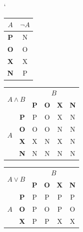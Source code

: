 \documentclass[a4paper, 11pt]{article}
\begin{document}
\begin{table}[ht]
    \begin{center}
        \catcode`
        \begin{tabular}{|c|c|}
            \hline
            $A$ & $\neg A$ \\
            \hline
            \textbf{P} & N \\
            \hline
            \textbf{O} & O \\
            \hline
            \textbf{X} & X \\
            \hline
            \textbf{N} & P \\
            \hline
        \end{tabular}
        \begin{tabular}{|c|c|c|c|c|c|}
            \hline
            \multicolumn{2}{|c|}{\multirow{2}{*}{$A \land B$}} & \multicolumn{4}{c|}{$B$}  \\
            \cline{3-6}
            \multicolumn{2}{|c|}{} & \textbf{P} & \textbf{O} & \textbf{X} & \textbf{N}     \\
            \hline
            \multirow{4}{*}{$A$}   & \textbf{P} & P          & O          & X          & N \\
            \cline{2-6}
                                   & \textbf{O} & O          & O          & N          & N \\
            \cline{2-6}
                                   & \textbf{X} & X          & N          & X          & N \\
            \cline{2-6}
                                   & \textbf{N} & N          & N          & N          & N \\
            \hline
        \end{tabular}
        \begin{tabular}{|c|c|c|c|c|c|}
            \hline
            \multicolumn{2}{|c|}{\multirow{2}{*}{$A \lor B$}} & \multicolumn{4}{c|}{$B$}   \\
            \cline{3-6}
            \multicolumn{2}{|c|}{} & \textbf{P} & \textbf{O} & \textbf{X} & \textbf{N}     \\
            \hline
            \multirow{4}{*}{$A$}   & \textbf{P} & P          & P          & P          & P \\
            \cline{2-6}
                                   & \textbf{O} & P          & O          & P          & O \\
            \cline{2-6}
                                   & \textbf{X} & P          & P          & X          & X \\

\end{tabular}
\end{center}
\end{table}
\end{document}
